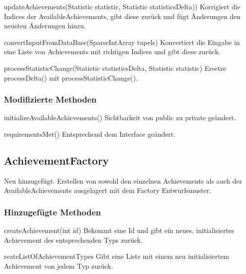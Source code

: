 \begin{description}
	\item{updateAchievements(Statistic statistic, Statistic statisticsDelta))}
	Korrigiert die Indices der AvailableAchievements, gibt diese zurück und fügt Änderungen den neusten Änderungen hinzu.	
	
	\item{convertInputFromDataBase(SparseIntArray tupels)}
	Konvertiert die Eingabe in eine Liste von Achievements mit richtigen Indices und gibt diese zurück.

	\item{processStatisticChange(Statistic statisticsDelta, Statistic statistic)}
	Ersetze processDelta() mit processStatisticChange().
	
\end{description}



\subsubsection{Modifizierte Methoden}

\begin{description}
	\item{initializeAvailableAchievements()}
	Sichtbarkeit von public zu private geändert.
	
	\item{requirementsMet()}
	Entsprechend dem Interface geändert.	
\end{description}



\subsection{AchievementFactory}
Neu hinzugefügt.
Erstellen von sowohl den einzelnen Achievements als auch der AvailableAchievements ausgelagert mit dem Factory Entwurfsmuster.

\subsubsection{Hinzugefügte Methoden}

\begin{description}
	\item{createAchievement(int id)}
	Bekommt eine Id und gibt ein neues, initialisiertes Achievement des entsprechenden Typs zurück.

	\item{reateListOfAchievementTypes}
	Gibt eine Liste mit einem neu initialisiertem Achievement von jedem Typ zurück.

\end{description}


